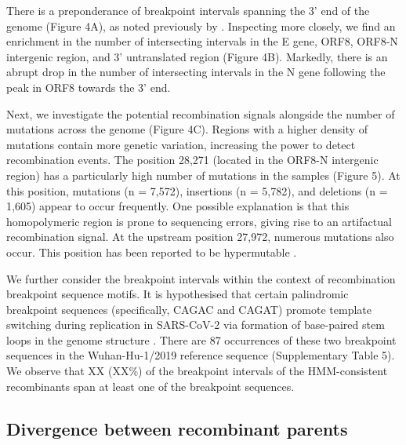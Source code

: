\documentclass{article}
\begin{document}
There is a preponderance of breakpoint intervals spanning the 3’ end of the
genome (Figure 4A), as noted previously by \cite{Turakhia2022-it}. Inspecting
more closely, we find an enrichment in the number of intersecting intervals in
the E gene, ORF8, ORF8-N intergenic region, and 3’ untranslated region (Figure
4B). Markedly, there is an abrupt drop in the number of intersecting intervals
in the N gene following the peak in ORF8 towards the 3’ end.

Next, we investigate the potential recombination signals alongside the number
of mutations across the genome (Figure 4C). Regions with a higher density of
mutations contain more genetic variation, increasing the power to detect
recombination events. The position 28,271 (located in the ORF8-N intergenic
region) has a particularly high number of mutations in the samples (Figure 5).
At this position, mutations (n = 7,572), insertions (n = 5,782), and deletions
(n = 1,605) appear to occur frequently. One possible explanation is that this
homopolymeric region is prone to sequencing errors, giving rise to an
artifactual recombination signal. At the upstream position 27,972, numerous
mutations also occur. This position has been reported to be hypermutable
\citep{Jungreis2021-dh}.

We further consider the breakpoint intervals within the context of
recombination breakpoint sequence motifs. It is hypothesised that certain
palindromic breakpoint sequences (specifically, CAGAC and CAGAT) promote
template switching during replication in SARS-CoV-2 via formation of
base-paired stem loops in the genome structure \citep{Gallaher2020-lb}. There
are 87 occurrences of these two breakpoint sequences in the Wuhan-Hu-1/2019
reference sequence (Supplementary Table 5). We observe that XX (XX\%) of the
breakpoint intervals of the HMM-consistent recombinants span at least one of
the breakpoint sequences.

\subsection{Divergence between recombinant parents}
\label{sec:parent_divergence}
\end{document}
